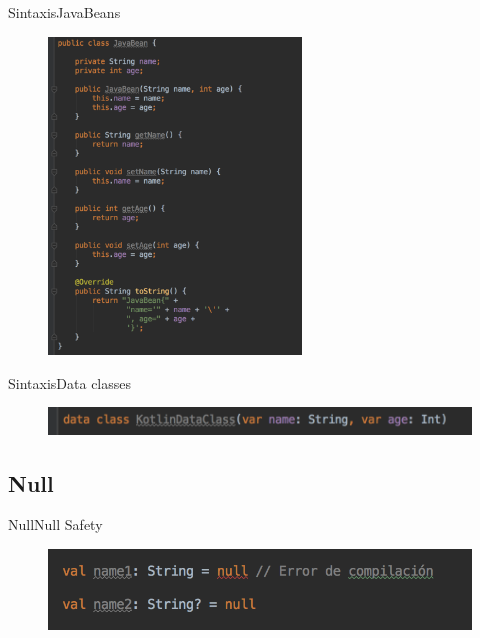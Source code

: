 \begin{frame}{Sintaxis}{JavaBeans}
    \begin{figure}[h]
    \centering
    \includegraphics[width=0.6\textwidth]{images/kotlin_vs_java/java_bean}
    \end{figure}
\end{frame}

\begin{frame}{Sintaxis}{Data classes}
    \begin{figure}[h]
    \centering
    \includegraphics[width=\textwidth]{images/kotlin_vs_java/kotlin_data_class}
    \end{figure}
\end{frame}

\subsection{Null}

\begin{frame}{Null}{Null Safety}
    \begin{figure}[h]
    \centering
    \includegraphics[width=\textwidth]{images/kotlin_vs_java/null_1}
    \end{figure}
\end{frame}

